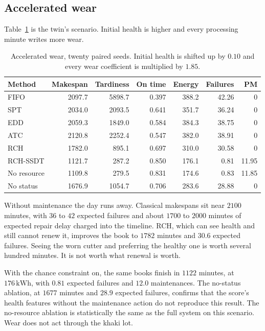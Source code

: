 \subsection{Accelerated wear}

Table~\ref{tab:wear} is the twin's scenario. Initial health is higher and every processing minute writes more wear.

\begin{table}[ht]
\centering
\caption{Accelerated wear, twenty paired seeds. Initial health is shifted up by \(0.10\) and every wear coefficient is multiplied by \(1.85\).}
\label{tab:wear}
\small
\begin{tabular}{lrrrrrr}
\toprule
Method & Makespan & Tardiness & On time & Energy & Failures & PM \\
\midrule
FIFO & 2097.7 & 5898.7 & 0.397 & 388.2 & 42.26 & 0 \\
SPT & 2034.0 & 2093.5 & 0.641 & 351.7 & 36.24 & 0 \\
EDD & 2059.3 & 1849.0 & 0.584 & 384.3 & 38.75 & 0 \\
ATC & 2120.8 & 2252.4 & 0.547 & 382.0 & 38.91 & 0 \\
RCH & 1782.0 & 895.1 & 0.697 & 310.0 & 30.58 & 0 \\
RCH-SSDT & 1121.7 & 287.2 & 0.850 & 176.1 & 0.81 & 11.95 \\
No resource & 1109.8 & 279.5 & 0.831 & 174.6 & 0.83 & 11.85 \\
No status & 1676.9 & 1054.7 & 0.706 & 283.6 & 28.88 & 0 \\
\bottomrule
\end{tabular}
\end{table}

Without maintenance the day runs away. Classical makespans sit near \(2100\) minutes, with \(36\) to \(42\) expected failures and about \(1700\) to \(2000\) minutes of expected repair delay charged into the timeline. RCH, which can see health and still cannot renew it, improves the book to \(1782\) minutes and \(30.6\) expected failures. Seeing the worn cutter and preferring the healthy one is worth several hundred minutes. It is not worth what renewal is worth.

With the chance constraint on, the same books finish in \(1122\) minutes, at \(176\,\mathrm{kWh}\), with \(0.81\) expected failures and \(12.0\) maintenances. The no-status ablation, at \(1677\) minutes and \(28.9\) expected failures, confirms that the score's health features without the maintenance action do not reproduce this result. The no-resource ablation is statistically the same as the full system on this scenario. Wear does not act through the khaki lot.

